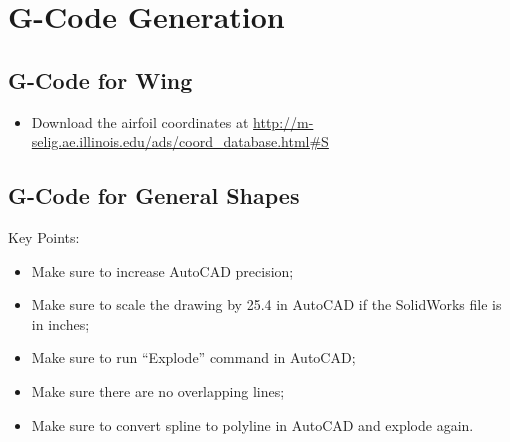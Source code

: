 \documentclass[titlepage,10pt,letter]{report}
\numberwithin{equation}{chapter}
\begin{document}
\newpage

\section{G-Code Generation}
\subsection{G-Code for Wing}
\begin{itemize}[noitemsep,topsep=0pt] 
	\item Download the airfoil coordinates at \href{http://m-selig.ae.illinois.edu/ads/coord_database.html#S}{http://m-selig.ae.illinois.edu/ads/coord\_database.html\#S}
	
\end{itemize}

\subsection{G-Code for General Shapes}
\begin{tcolorbox}
	{\Large
		\noindent Key Points:
		\begin{itemize}[noitemsep,topsep=0pt]
			\item Make sure to increase AutoCAD precision;
			\item Make sure to scale the drawing by 25.4 in AutoCAD if the SolidWorks file is in inches;
			\item Make sure to run ``Explode'' command in AutoCAD;
			\item Make sure there are no overlapping lines;
			\item Make sure to convert spline to polyline in AutoCAD and explode again.
		\end{itemize}
	}
\end{tcolorbox}
\end{document}
